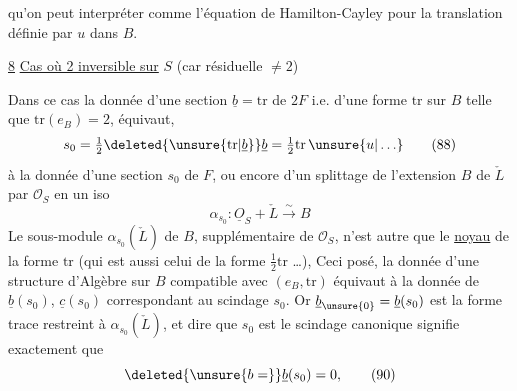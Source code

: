 qu'on peut interpréter comme l'équation de
Hamilton-Cayley pour la  translation  définie
par $u$ dans $B$.

\uline{8} \uline{Cas où 2 inversible sur} $S$ (car résiduelle $\ne2$)

Dans ce cas la donnée d'une section $\underline b=\mathrm{tr}$ de
$2F$ i.e. d'une forme $\mathrm{tr}$ sur $B$ telle que $\mathrm{tr}(e_B)=2$,
équivaut, 
\[
 s_0=\tfrac12\deleted{\unsure{\mathrm{tr}|\underline b}}\underline b=\tfrac12\mathrm{tr}\,\unsure{u|\ldots} \tag*{(88)}
\]
à la donnée d'une section  $s_0$ de $F$, ou encore
d'un splittage de l'extension $B$ de $\check L$ par $\mathcal O_S$ en
un iso
\[
\alpha_{s_0}:\underline O_S+\check L\xrightarrow{\sim}B \tag*{(89)}
\]
Le sous-module $\alpha_{s_0}(\check L)$ de $B$, supplémentaire
de $\mathcal O_S$, n'est autre que le \uline{noyau} de la
forme $\mathrm{tr}$ (qui est aussi celui de la forme
$\tfrac12\mathrm{tr}$ \ldots), 
Ceci posé, la donnée d'une
structure d'Algèbre sur $B$ compatible avec
$(e_B,\mathrm{tr})$ équivaut à la donnée de
$\underline b(s_0)$, $\underline c(s_0)$ correspondant au scindage $s_0$.
Or   $\underline b_{\unsure{0}}=\underline b(s_0)$ est la forme trace restreint à
$\alpha_{s_0}(\check L)$, et dire que  $s_0$ est le scindage canonique
signifie exactement que
\[
\deleted{\unsure{b=}}\underline b(s_0)=0,\tag*{(90)}
\]
